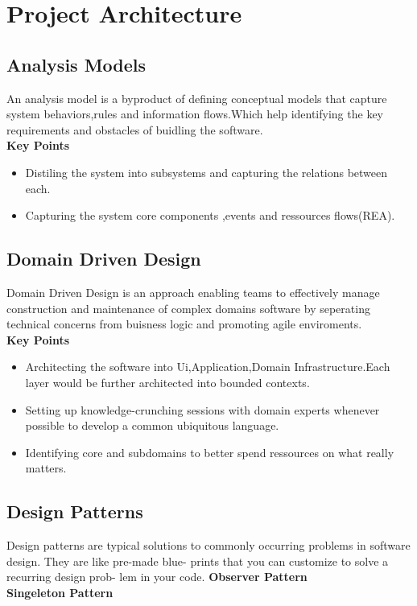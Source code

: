 \documentclass{article}
\begin{document}
\section{Project Architecture}
\subsection{Analysis Models}
An analysis model is a byproduct of defining conceptual models that capture system behaviors,rules and information flows.Which help identifying the key requirements and obstacles of buidling the software.\\
\textbf{Key Points}
\begin{itemize}
\item Distiling the system into subsystems and capturing the relations between each.
\item Capturing the system core components ,events and ressources flows(REA).
\end{itemize}

\subsection{Domain Driven Design}
Domain Driven Design is an approach enabling teams to effectively manage construction and maintenance of complex domains software by seperating technical concerns from buisness logic and promoting agile enviroments.\\
\textbf{Key Points}
\begin{itemize}
\item Architecting the software into Ui,Application,Domain Infrastructure.Each layer would be further architected into bounded contexts.
\item Setting up knowledge-crunching sessions with domain experts whenever possible to develop a common ubiquitous language.
\item Identifying core and subdomains to better spend ressources on what really matters. 
\end{itemize}

\subsection{Design Patterns}
Design patterns are typical solutions to commonly occurring
problems in software design. They are like pre-made blue-
prints that you can customize to solve a recurring design prob-
lem in your code.
\textbf{Observer Pattern}\\
\textbf{Singeleton Pattern}\\
\end{document}
